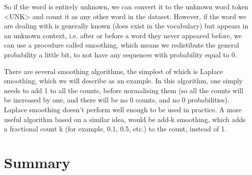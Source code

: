 So if the word is entirely unknown, we can convert it to the unknown word token <UNK> and count it as any other word in the dataset. However, if the word we are dealing with is generally known (does exist in the vocabulary) but appears in an unknown context, i.e. after or before a word they never appeared before, we can use a procedure called smoothing, which means we redistibute the general probability a little bit, to not have any sequences with probability equal to 0.

There are several smoothing algorithms, the simplest of which is Laplace smoothing, which we will describe as an example. In this algorithm, one simply needs to add 1 to all the counts, before normalising them (so all the counts will be increased by one, and there will be no 0 counts, and no 0 probabilities). Laplace smoothing doesn't perform well enough to be used in practice. A more useful algorithm based on a similar idea, would be add-k smoothing, which adds a fractional count k (for example, 0.1, 0.5, etc.) to the count, instead of 1.

\section{Summary}
